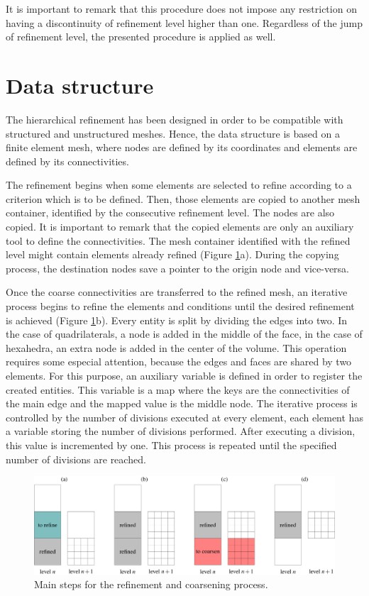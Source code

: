 It is important to remark that this procedure does not impose any restriction on having a discontinuity of refinement level higher than one. Regardless of the jump of refinement level, the presented procedure is applied as well.



\section{Data structure}

The hierarchical refinement has been designed in order to be compatible with structured and unstructured meshes. Hence, the data structure is based on a finite element mesh, where nodes are defined by its coordinates and elements are defined by its connectivities.

The refinement begins when some elements are selected to refine according to a criterion which is to be defined. Then, those elements are copied to another mesh container, identified by the consecutive refinement level. The nodes are also copied. It is important to remark that the copied elements are only an auxiliary tool to define the connectivities. The mesh container identified with the refined level might contain elements already refined (Figure \ref{multilevel_meshing_steps}{\color{wrmBlue}a}). During the copying process, the destination nodes save a pointer to the origin node and vice-versa.

Once the coarse connectivities are transferred to the refined mesh, an iterative process begins to refine the elements and conditions until the desired refinement is achieved (Figure \ref{multilevel_meshing_steps}{\color{wrmBlue}b}). Every entity is split by dividing the edges into two. In the case of quadrilaterals, a node is added in the middle of the face, in the case of hexahedra, an extra node is added in the center of the volume. This operation requires some especial attention, because the edges and faces are shared by two elements. For this purpose, an auxiliary variable is defined in order to register the created entities. This variable is a map where the keys are the connectivities of the main edge and the mapped value is the middle node. The iterative process is controlled by the number of divisions executed at every element, each element has a variable storing the number of divisions performed. After executing a division, this value is incremented by one. This process is repeated until the specified number of divisions are reached.

\begin{figure}
    \centering
    \includegraphics[width=\textwidth]{img/multigrid/multilevel_meshing_steps.pdf}
    \caption{Main steps for the refinement and coarsening process.}
    \label{multilevel_meshing_steps}
\end{figure}

